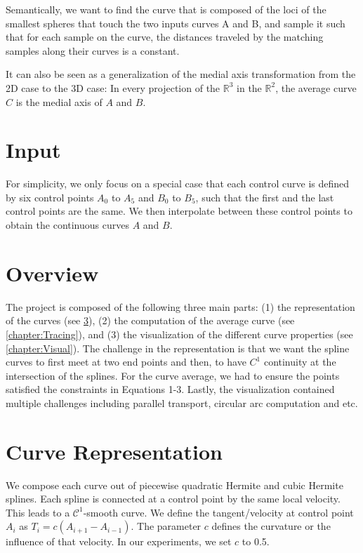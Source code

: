 \documentclass[journal, letterpaper]{IEEEtran}
\begin{document}
Semantically, we want to find the curve that is composed of the loci of the smallest spheres that touch the two inputs curves A and B,
and sample it such that for each sample on the curve, the distances traveled by the matching samples along their curves is a constant.

It can also be seen as a generalization of the medial axis transformation from the 2D case to the 3D case: 
In every projection of the $\mathbb{R}^3$ in the $\mathbb{R}^2$, the average curve $C$ is the medial axis of $A$ and $B$.

\section{Input}
For simplicity, we only focus on a special case that each control curve is defined by six control points $A_0$ to $A_5$ and $B_0$ to $B_5$, such that the first and the last control points are the same.
We then interpolate between these control points to obtain the continuous curves $A$ and $B$.

\section{Overview}
The project is composed of the following three main parts: (1) the representation of the curves (see \ref{chapter:CurveRepr}),
(2) the computation of the average curve (see \ref{chapter:Tracing}), and (3) the visualization of the different curve properties (see \ref{chapter:Visual}).
The challenge in the representation is that we want the spline curves to first meet at two end points and then,
to have $C^1$ continuity at the intersection of the splines. For the curve average, we had to ensure
the points satisfied the constraints in Equations 1-3. Lastly, the visualization contained multiple challenges
including parallel transport, circular arc computation and etc.

\section{Curve Representation}\label{chapter:CurveRepr}
We compose each curve out of piecewise quadratic Hermite and cubic Hermite splines. Each spline is connected at a control point by the same local velocity. This leads to a $\mathcal{C}^1$-smooth curve.
We define the tangent/velocity at control point $A_i$ as $T_i = c(A_{i+1}-A_{i-1})$. The parameter $c$ defines the curvature or the influence of that velocity. In our experiments, we set $c$ to 0.5.
\end{document}
